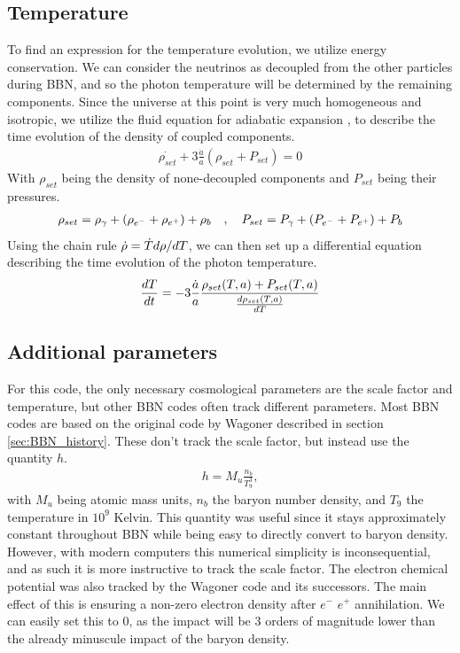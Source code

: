 \subsection{Temperature}
To find an expression for the temperature evolution, we utilize energy conservation. We can consider the neutrinos as decoupled from the other particles during BBN, and so the photon temperature will be determined by the remaining components. Since the universe at this point is very much homogeneous and isotropic, we utilize the fluid equation for adiabatic expansion \cite[{(4.44)}]{Ryden}, to describe the time evolution of the density of coupled components.
\begin{align}
    \dot{\rho_{set}}+3\frac{\dot{a}}{a}(\rho_{set} + P_{set})=0
\end{align}
With $\rho_{set}$ being the density of none-decoupled components and $P_{set}$ being their pressures.
\begin{align}
    \rho_{set}=\rho_{\gamma}+(\rho_{e^-}+\rho_{e^+})+\rho_{b}
    \quad , \quad P_{set}=P_{\gamma}+(P_{e^-}+P_{e^+})+P_{b}
\end{align}
Using the chain rule $\dot{\rho}=\dot{T}d\rho/dT$, we can then set up a differential equation describing the time evolution of the photon temperature. 
\begin{align}
    \frac{dT}{dt}=-3\frac{\dot{a}}{a}\frac{\rho_{set}(T,a) + P_{set}(T,a)}{\frac{d\rho_{set}(T,a)}{dT}}
    \label{eq:dTdt}
\end{align}

\subsection{Additional parameters}
For this code, the only necessary cosmological parameters are the scale factor and temperature, but other BBN codes often track different parameters. Most BBN codes are based on the original code by Wagoner described in section \ref{sec:BBN_history}. These don't track the scale factor, but instead use the quantity $h$.
\begin{align}
    h=M_u\frac{n_{b}}{T^3_9},
\end{align}
with $M_u$ being atomic mass units, $n_b$ the baryon number density, and  $T_9$ the temperature in $10^9$ Kelvin. This quantity was useful since it stays approximately constant throughout BBN while being easy to directly convert to baryon density. However, with modern computers this numerical simplicity is inconsequential, and as such it is more instructive to track the scale factor.
The electron chemical potential was also tracked by the Wagoner code and its successors. The main effect of this is ensuring a non-zero electron density after $e^-$ $e^+$ annihilation. We can easily set this to 0, as the impact will be 3 orders of magnitude lower than the already minuscule impact of the baryon density.

